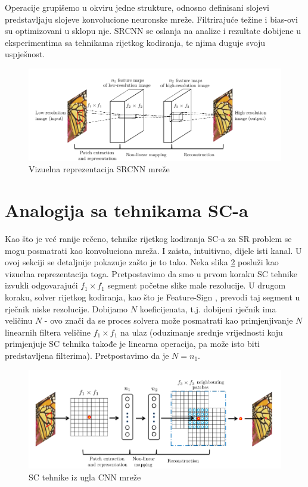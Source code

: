 \documentclass[12pt]{report}
\numberwithin{equation}{section}
\begin{document}
Operacije grupišemo u okviru jedne strukture, odnosno  definisani slojevi predstavljaju slojeve konvolucione neuronske mreže. Filtrirajuće težine i bias-ovi su optimizovani u sklopu nje. SRCNN se oslanja na analize i rezultate dobijene u eksperimentima sa tehnikama rijetkog kodiranja, te njima duguje svoju uspješnost. 

\begin{figure}[h]
\includegraphics[width=\textwidth]{SLIKE/figure2}
\centering
\caption{Vizuelna reprezentacija SRCNN mreže}
\label{fig:srcnn}
\end{figure}


\section{Analogija sa tehnikama SC-a}\label{ch2}

Kao što je već ranije rečeno, tehnike rijetkog kodiranja SC-a za SR problem se mogu posmatrati kao konvoluciona mreža. I zaista, intuitivno, dijele isti kanal. U ovoj sekciji se detaljnije pokazuje zašto je to tako. Neka slika \ref{fig:rep} posluži kao vizuelna reprezentacija toga. 
Pretpostavimo da smo u prvom koraku SC tehnike izvukli odgovarajući $f_1 \times f_1$ segment početne slike male rezolucije. U drugom koraku, solver rijetkog kodiranja, kao što je Feature-Sign \cite{sparse}, prevodi taj segment u rječnik niske rezolucije. Dobijamo $N$ koeficijenata, t.j. dobijeni rječnik ima veličinu $N$ - ovo znači da se proces solvera može posmatrati kao primjenjivanje $N$ linearnih filtera veličine $f_1 \times f_1$ na ulaz (oduzimanje srednje vrijednosti koju primjenjuje SC tehnika takođe je linearna operacija, pa može isto biti predstavljena filterima). Pretpostavimo da je $N = n_1$. 


\begin{figure}[h]
\includegraphics[width=\textwidth]{SLIKE/figure3}
\centering
\caption{SC tehnike iz ugla CNN mreže}
\label{fig:rep}
\end{figure}
\end{document}
